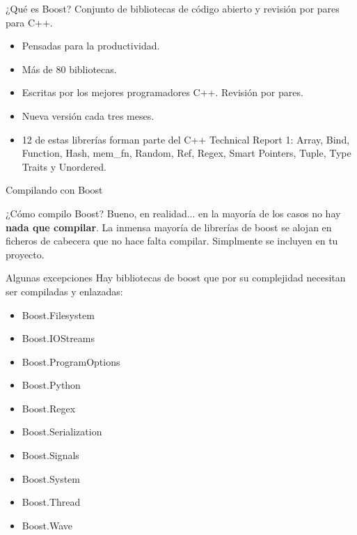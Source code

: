 \documentclass[8pt,xcolor=svgnames]{beamer}
\begin{document}
\begin{frame}{¿Qué es Boost?}
  Conjunto de bibliotecas de código abierto y revisión por pares para C++.
  \begin{itemize}
  \item Pensadas para la productividad.
  \item Más de 80 bibliotecas.
  \item Escritas por los mejores programadores C++. Revisión por pares.
  \item Nueva versión cada tres meses.
  \item 12 de estas librerías forman parte del C++ Technical Report 1:
    Array, Bind, Function, Hash, mem\_fn, Random, Ref, Regex, Smart
    Pointers, Tuple, Type Traits y Unordered.
  \end{itemize}
\end{frame}

\begin{frame}{Compilando con Boost}
  \begin{block}{¿Cómo compilo Boost?}
    Bueno, en realidad... en la mayoría de los casos no hay
    \textbf{nada que compilar}. La inmensa mayoría de librerías de
    boost se alojan en ficheros de cabecera que no hace falta
    compilar. Simplmente se incluyen en tu proyecto.
  \end{block}

  \begin{block}{Algunas excepciones}
    Hay bibliotecas de boost que por su complejidad necesitan ser
    compiladas y enlazadas:
    {\scriptsize
      \begin{itemize}
      \item Boost.Filesystem
      \item Boost.IOStreams
      \item Boost.ProgramOptions
      \item Boost.Python
      \item Boost.Regex
      \item Boost.Serialization
      \item Boost.Signals
      \item Boost.System
      \item Boost.Thread
      \item Boost.Wave
      \end{itemize}
    }
  \end{block}
  
\end{frame}
\end{document}
